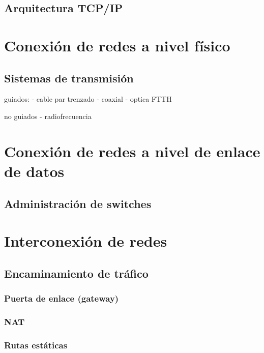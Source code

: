 \section{Arquitectura TCP/IP}





\chapter{Conexión de redes a nivel físico}



\hypertarget{sistemas_transmision}{}
\section{Sistemas de transmisión}

guiados:
- cable par trenzado
- coaxial
- optica
FTTH

no guiados
- radiofrecuencia



\chapter{Conexión de redes a nivel de enlace de datos}


\section{Administración de switches}



\chapter{Interconexión de redes}

\section{Encaminamiento de tráfico}

\subsection{Puerta de enlace (gateway)}

\subsection{NAT}


\subsection{Rutas estáticas}


